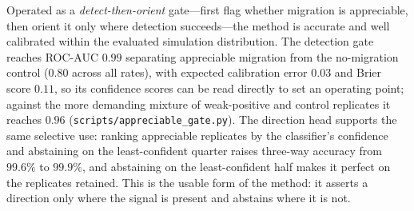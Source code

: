 \documentclass[11pt]{article}
\theoremstyle{plain}
\theoremstyle{definition}
\theoremstyle{remark}
\begin{document}
Operated as a \emph{detect-then-orient} gate---first flag whether migration is appreciable, then
orient it only where detection succeeds---the method is accurate and well calibrated within the
evaluated simulation distribution. The
detection gate reaches ROC-AUC $0.99$ separating appreciable migration from the no-migration
control ($0.80$ across all rates), with expected calibration error $0.03$ and Brier score $0.11$,
so its confidence scores can be read directly to set an operating point; against the more
demanding mixture of weak-positive and control replicates it reaches $0.96$
(\texttt{scripts/appreciable\_gate.py}). The direction head supports the same selective use: ranking
appreciable replicates by the classifier's confidence and abstaining on the least-confident quarter
raises three-way accuracy from $99.6\%$ to $99.9\%$, and abstaining on the least-confident half makes
it perfect on the replicates retained. This is the usable form of the method: it asserts a direction
only where the signal is present and abstains where it is not.
\end{document}

